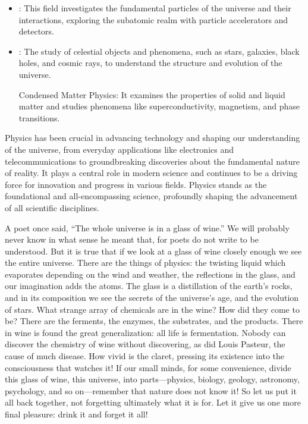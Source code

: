 \begin{itemize}
	\item {}: This field investigates the fundamental particles of the universe and their interactions, exploring the subatomic realm with particle accelerators and detectors.

	\item {}: The study of celestial objects and phenomena, such as stars, galaxies, black holes, and cosmic rays, to understand the structure and evolution of the universe.

Condensed Matter Physics: It examines the properties of solid and liquid matter and studies phenomena like superconductivity, magnetism, and phase transitions.
\end{itemize}

Physics has been crucial in advancing technology and shaping our understanding of the universe, from everyday applications like electronics and telecommunications to groundbreaking discoveries about the fundamental nature of reality. It plays a central role in modern science and continues to be a driving force for innovation and progress in various fields. Physics stands as the foundational and all-encompassing science, profoundly shaping the advancement of all scientific disciplines.

\begin{interestnote}
	A poet once said, “The whole universe is in a glass of wine.” We will probably never know in what sense he meant that, for poets do not write to be understood. But it is true that if we look at a glass of wine closely enough we see the entire universe. There are the things of physics: the twisting liquid which evaporates depending on the wind and weather, the reflections in the glass, and our imagination adds the atoms. The glass is a distillation of the earth’s rocks, and in its composition we see the secrets of the universe’s age, and the evolution of stars. What strange array of chemicals are in the wine? How did they come to be? There are the ferments, the enzymes, the substrates, and the products. There in wine is found the great generalization: all life is fermentation. Nobody can discover the chemistry of wine without discovering, as did Louis Pasteur, the cause of much disease. How vivid is the claret, pressing its existence into the consciousness that watches it! If our small minds, for some convenience, divide this glass of wine, this universe, into parts—physics, biology, geology, astronomy, psychology, and so on—remember that nature does not know it! So let us put it all back together, not forgetting ultimately what it is for. Let it give us one more final pleasure: drink it and forget it all! \cite{bib:feynman lectures}
\end{interestnote}




















